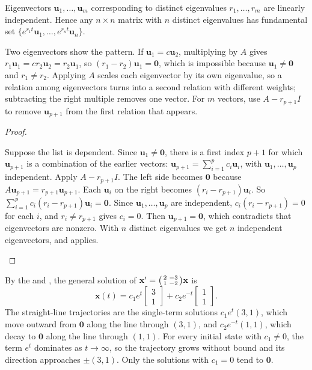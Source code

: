 \documentclass[10pt]{scrartcl}
\newcommand{\vv}[1]{\mathbf{#1}}
\begin{document}
\begin{theorem*}
  Eigenvectors $\vv u_1,\dots,\vv u_m$ corresponding to distinct eigenvalues $r_1,\dots,r_m$ are linearly independent. Hence any $n\times n$ matrix with $n$ distinct eigenvalues has fundamental set $\{e^{r_1 t}\vv u_1,\dots,e^{r_n t}\vv u_n\}$.
\end{theorem*}
\begin{ideabox}
  Two eigenvectors show the pattern. If $\vv u_1=c\vv u_2$, multiplying by $A$ gives $r_1\vv u_1=cr_2\vv u_2=r_2\vv u_1$, so $(r_1-r_2)\vv u_1=\vv 0$, which is impossible because $\vv u_1\neq\vv 0$ and $r_1\neq r_2$. Applying $A$ scales each eigenvector by its own eigenvalue, so a relation among eigenvectors turns into a second relation with different weights; subtracting the right multiple removes one vector. For $m$ vectors, use $A-r_{p+1}I$ to remove $\vv u_{p+1}$ from the first relation that appears.
\end{ideabox}
\begin{proof}
  \begin{steps}
    \ii Suppose the list is dependent. Since $\vv u_1\neq\vv 0$, there is a first index $p+1$ for which $\vv u_{p+1}$ is a combination of the earlier vectors: $\vv u_{p+1}=\sum_{i=1}^p c_i\vv u_i$, with $\vv u_1,\dots,\vv u_p$ independent.
    \ii Apply $A-r_{p+1}I$. The left side becomes $\vv 0$ because $A\vv u_{p+1}=r_{p+1}\vv u_{p+1}$. Each $\vv u_i$ on the right becomes $(r_i-r_{p+1})\vv u_i$. So $\sum_{i=1}^p c_i(r_i-r_{p+1})\vv u_i=\vv 0$.
    \ii Since $\vv u_1,\dots,\vv u_p$ are independent, $c_i(r_i-r_{p+1})=0$ for each $i$, and $r_i\neq r_{p+1}$ gives $c_i=0$. Then $\vv u_{p+1}=\vv 0$, which contradicts that eigenvectors are nonzero.
    \ii With $n$ distinct eigenvalues we get $n$ independent eigenvectors, and  applies. \qedhere
  \end{steps}
\end{proof}

\revisit By the  and , the general solution of $\vv x'=\begin{psmallmatrix}2&-3\\1&-2\end{psmallmatrix}\vv x$ is
\[
  \vv x(t) = c_1 e^t\begin{bmatrix}3\\1\end{bmatrix} + c_2 e^{-t}\begin{bmatrix}1\\1\end{bmatrix}.
\]
The straight-line trajectories are the single-term solutions $c_1e^t(3,1)$, which move outward from $\vv 0$ along the line through $(3,1)$, and $c_2e^{-t}(1,1)$, which decay to $\vv 0$ along the line through $(1,1)$. For every initial state with $c_1\neq 0$, the term $e^t$ dominates as $t\to\infty$, so the trajectory grows without bound and its direction approaches $\pm(3,1)$. Only the solutions with $c_1=0$ tend to $\vv 0$.
\end{document}
